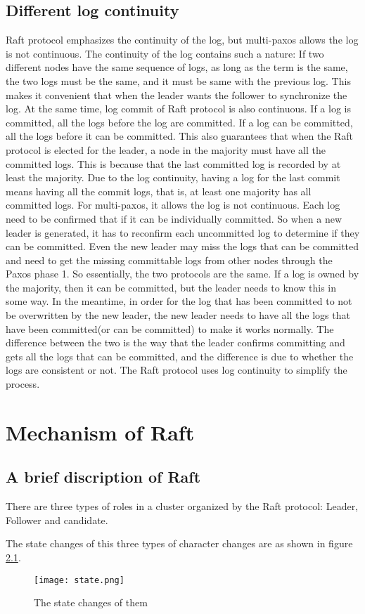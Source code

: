 \documentclass{report}
\begin{document}
\section{Different log continuity}
Raft protocol emphasizes the continuity of the log, but multi-paxos allows the log is not continuous. The continuity of the log contains such a nature: If two different nodes have the same sequence of logs, as long as the term is the same, the two logs must be the same, and it must be same with the previous log. This makes it convenient that when the leader wants the follower to synchronize the log. At the same time, log commit of Raft protocol is also continuous. If a log is committed, all the logs before the log are committed. If a log can be committed, all the logs before it can be committed. This also guarantees that when the Raft protocol is elected for the leader, a node in the majority must have all the committed logs. This is because that the last committed log is recorded by at least the majority. Due to the log continuity, having a log for the last commit means having all the commit logs, that is, at least one majority has all committed logs. For multi-paxos, it allows the log is not continuous. Each log need to be confirmed that if it can be individually committed. So when a new leader is generated, it has to reconfirm each uncommitted log to determine if they can be committed. Even the new leader may miss the logs that can be committed and need to get the missing committable logs from other nodes through the Paxos phase 1. So essentially, the two protocols are the same. If a log is owned by the majority, then it can be committed, but the leader needs to know this in some way. In the meantime, in order for the log that has been committed to not be overwritten by the new leader, the new leader needs to have all the logs that have been committed(or can be committed) to make it works normally. The difference between the two is the way that the leader confirms committing and gets all the logs that can be committed, and the difference is due to whether the logs are consistent or not. The Raft protocol uses log continuity to simplify the process.



\chapter{Mechanism of Raft}


\section{A brief discription of Raft}
There are three types of roles in a cluster organized by the Raft protocol: Leader, Follower and candidate.\par
The state changes of this three types of character changes are as shown in figure \ref{fig:state}.
\begin{figure}[H]
    \centering
    \texttt{[image: state.png]}
    \caption{The state changes of them}
    \label{fig:state}
\end{figure}
\end{document}
